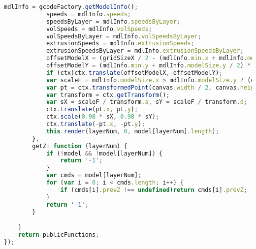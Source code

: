 \begin{lstlisting}[language=JavaScript, label={lst:renderFactory}, caption=When render frames are requested this file compiles the lines of gcode from the worker and sets up the rest of the canvas frames.]
            mdlInfo = gcodeFactory.getModelInfo();
            speeds = mdlInfo.speeds;
            speedsByLayer = mdlInfo.speedsByLayer;
            volSpeeds = mdlInfo.volSpeeds;
            volSpeedsByLayer = mdlInfo.volSpeedsByLayer;
            extrusionSpeeds = mdlInfo.extrusionSpeeds;
            extrusionSpeedsByLayer = mdlInfo.extrusionSpeedsByLayer;
            offsetModelX = (gridSizeX / 2 - (mdlInfo.min.x + mdlInfo.modelSize.x / 2)) * zoomFactor;
            offsetModelY = (mdlInfo.min.y + mdlInfo.modelSize.y / 2) * zoomFactor - gridSizeY / 2 * zoomFactor;
            if (ctx)ctx.translate(offsetModelX, offsetModelY);
            var scaleF = mdlInfo.modelSize.x > mdlInfo.modelSize.y ? (canvas.width) / mdlInfo.modelSize.x / zoomFactor : (canvas.height) / mdlInfo.modelSize.y / zoomFactor;
            var pt = ctx.transformedPoint(canvas.width / 2, canvas.height / 2);
            var transform = ctx.getTransform();
            var sX = scaleF / transform.a, sY = scaleF / transform.d;
            ctx.translate(pt.x, pt.y);
            ctx.scale(0.98 * sX, 0.98 * sY);
            ctx.translate(-pt.x, -pt.y);
            this.render(layerNum, 0, model[layerNum].length);
        },
        getZ: function (layerNum) {
            if (!model && !model[layerNum]) {
                return '-1';
            }
            var cmds = model[layerNum];
            for (var i = 0; i < cmds.length; i++) {
                if (cmds[i].prevZ !== undefined)return cmds[i].prevZ;
            }
            return '-1';
        }

    }
    return publicFunctions;
});
\end{lstlisting}

